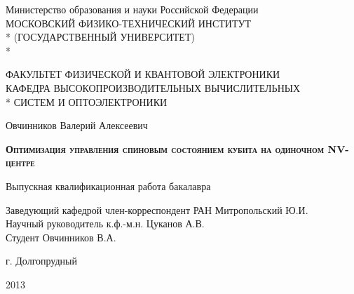 \begin{titlepage}
\newpage

\begin{center}
Министерство образования и науки Российской Федерации \\
\vspace{1cm}
МОСКОВСКИЙ ФИЗИКО-ТЕХНИЧЕСКИЙ ИНСТИТУТ \\*
(ГОСУДАРСТВЕННЫЙ УНИВЕРСИТЕТ) \\*
\hrulefill
\end{center}
 
\begin{center}
ФАКУЛЬТЕТ ФИЗИЧЕСКОЙ И КВАНТОВОЙ ЭЛЕКТРОНИКИ \\
\vspace{1cm}
КАФЕДРА ВЫСОКОПРОИЗВОДИТЕЛЬНЫХ ВЫЧИСЛИТЕЛЬНЫХ \\*
СИСТЕМ И ОПТОЭЛЕКТРОНИКИ
\end{center}

\vspace{3em}

\begin{center}
Овчинников Валерий Алексеевич
\end{center}
 
\begin{center}
\textsc{\textbf{Оптимизация управления спиновым состоянием \linebreak кубита на одиночном NV-центре}}
\end{center}

\vspace{2.5em}

\begin{center}
\Large Выпускная квалификационная работа бакалавра
\end{center}

\vspace{2em}
\vspace{2.5em}

\begin{flushleft}
Заведующий кафедрой  \hrulefill член-корреспондент РАН Митропольский Ю.И.\\
\vspace{1.5em}
Научный руководитель \hrulefill к.ф.-м.н. Цуканов А.В.\\
\vspace{1.5em}
Студент \hrulefill Овчинников В.А. \\
\end{flushleft}
 
\vspace{\fill}

\begin{center}
г. Долгопрудный
\end{center}
\begin{center}
2013
\end{center}

\end{titlepage}
